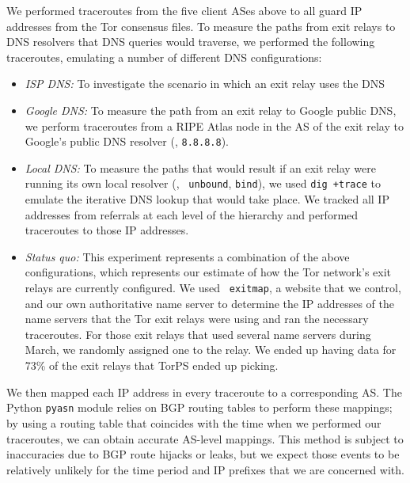 We performed traceroutes from the five client ASes above to all guard IP
      addresses from the Tor consensus files. To measure the paths from
      exit relays to DNS resolvers that DNS queries would traverse, we
      performed the following traceroutes, emulating a number of
      different DNS configurations:
\begin{itemize}
    \item \emph{ISP DNS:} To investigate the scenario in which an exit 
      relay uses the DNS 


    \item \emph{Google DNS:} To measure the path from an exit relay to
      Google public DNS, we perform traceroutes from a RIPE Atlas node
      in the AS of the exit relay to Google's public DNS resolver (\ie,
      {\tt 8.8.8.8}).

    \item \emph{Local DNS:} To measure the paths that would result if an
      exit relay were running its own local resolver (\eg, {\tt
        unbound}, {\tt bind}), we used {\tt dig +trace} to emulate the
      iterative DNS lookup that would take place. We tracked all IP
      addresses from referrals at each level of the hierarchy and
      performed traceroutes to those IP addresses.

    \item \emph{Status quo:} This experiment represents a combination of
      the above configurations, which represents our estimate of how the
      Tor network's exit relays are currently configured. We used {\tt
        exitmap}, a website that we control, and our own authoritative
      name server to determine the IP addresses of the name servers that
      the Tor exit relays were using and ran the necessary traceroutes. 
      For those exit relays that used several name servers during March, 
      we randomly assigned one to the relay. We ended up having data 
      for 73\% of the exit relays that TorPS ended up picking.
\end{itemize}
\noindent
We then mapped each IP address in every traceroute to a corresponding
AS.  The Python {\tt pyasn} module relies on BGP routing tables to
perform these mappings; by using a routing table that coincides with the
time when we performed our traceroutes, we can obtain accurate AS-level
mappings.  This method is subject to inaccuracies due to BGP route
hijacks or leaks, but we expect those events to be relatively unlikely
for the time period and IP prefixes that we are concerned with.

